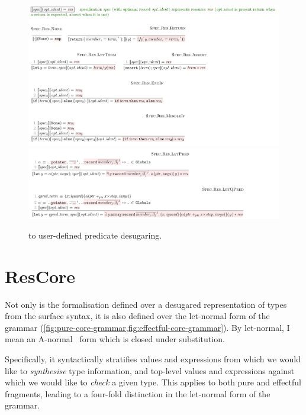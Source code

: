 \begin{figure}[tp]
    \includegraphics{figures/predicate-to-kernel-1}
    \includegraphics{figures/predicate-to-kernel-2}
    \caption{ to  user-defined predicate desugaring.}\label{fig:pred-to-kernel}
\end{figure}

\section{ResCore}\label{sec:rescore}

Not only is the formalisation defined over a desugared representation of types
from the surface  syntax, it is also defined over the let-normal form of
the  grammar
(\cref{fig:pure-core-grammar,fig:effectful-core-grammar}). By let-normal, I
mean an A-normal~ form which is closed under
substitution.

Specifically, it syntactically stratifies values and
expressions from which we would like to \emph{synthesise} type information, and
top-level values and expressions against which we would like to \emph{check} a
given type. This applies to both pure and effectful fragments, leading to a
four-fold distinction in the let-normal form of the grammar.

